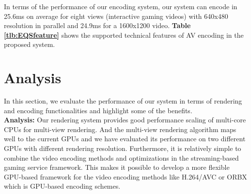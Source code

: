 \documentclass[conference]{IEEEtran}
\begin{document}
    In terms of the performance of our encoding system, our system can encode in 25.6ms on average for eight views (interactive gaming videos) with 640x480 resolution in parallel and 24.9ms for a 1600x1200 video.
    \textbf{Table \ref{tlb:EQSfeature}} shows the supported technical features of AV encoding in the proposed system.
    \begin{table}[htb]
    \caption{The supported features of audio/video encoding in our system.}
    \label{tlb:EQSfeature}
    \end{table}

    \section{Analysis}
    \label{sc:Comparison}
    In this section, we evaluate the performance of our system in terms of rendering and encoding functionalities and highlight some of the benefits.
    \\

    \noindent
    {\bf Analysis:} Our rendering system provides good performance scaling of multi-core CPUs for multi-view rendering.
    And the multi-view rendering algorithm maps well to the current GPUs and we have evaluated its performance on two different GPUs with different rendering resolution.
    Furthermore, it is relatively simple to combine the video encoding methods and optimizations in the streaming-based gaming service framework. This makes it possible to develop a more flexible GPU-based framework for the video encoding methods like H.264/AVC or ORBX which is GPU-based encoding schemes.\\
\end{document}
